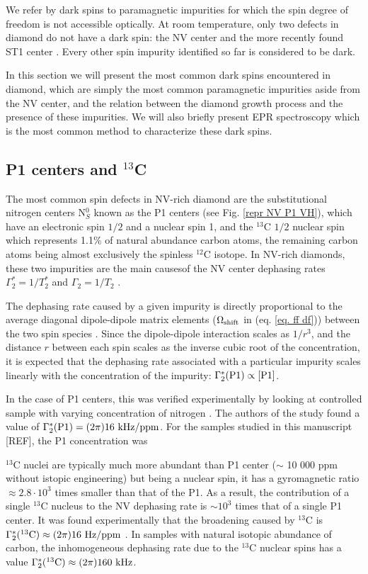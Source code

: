 \documentclass[a4paper,11pt]{report}
\begin{document}
We refer by dark spins to paramagnetic impurities for which the spin degree of freedom is not accessible optically. At room temperature, only two defects in diamond do not have a dark spin: the NV center and the more recently found ST1 center \citep{lee2013readout, john2017bright}. Every other spin impurity identified so far is considered to be dark.

In this section we will present the most common dark spins encountered in diamond, which are simply the most common paramagnetic impurities aside from the NV center, and the relation between the diamond growth process and the presence of these impurities. We will also briefly present EPR spectroscopy which is the most common method to characterize these dark spins.

\subsection{P1 centers and $^{13}$C}
The most common spin defects in NV-rich diamond are the substitutional nitrogen centers N$^0_S$ known as the P1 centers (see Fig. \ref{repr NV P1 VH}), which have an electronic spin $1/2$ and a nuclear spin 1, and the $^{13}$C $1/2$ nuclear spin which represents 1.1\% of natural abundance carbon atoms, the remaining carbon atoms being almost exclusively the spinless $^{12}$C isotope. In NV-rich diamonds, these two impurities are the main causesof the NV center dephasing rates $\Gamma_2^*=1/T_2^*$ and $\Gamma_2=1/T_2$  \citep{barry2020sensitivity}. 

The dephasing rate caused by a given impurity is directly proportional to the average diagonal dipole-dipole matrix elements ($\Omega_{\rm shift}$ in (eq. \ref{eq. ff df})) between the two spin species \citep{taylor2008high, bauch2020decoherence}. Since the dipole-dipole interaction scales as $1/r^3$, and the distance $r$ between each spin scales as the inverse cubic root of the concentration,  it is expected that the dephasing rate associated with a particular impurity scales linearly with the concentration of the impurity: $\Gamma_2^*(\rm P1) \propto [P1]$. 

In the case of P1 centers, this was verified experimentally by looking at controlled sample with varying concentration of nitrogen \citep{bauch2020decoherence}. The authors of the study found a value of $\Gamma_2^*(\rm P1)= (2 \pi) 16\ \rm kHz/ppm$. For the samples studied in this manuscript [REF], the P1 concentration was 

$^{13}$C nuclei are typically much more abundant than P1 center ($\sim$ 10 000 ppm without istopic engineering) but being a nuclear spin, it has a gyromagnetic ratio $\approx 2.8\cdot 10^3$ times smaller than that of the P1. As a result, the contribution of a single $^{13}$C nucleus to the NV dephasing rate is $\sim 10^3$ times that of a single P1 center. It was found experimentally that the broadening caused by $^{13}$C is $\Gamma_2^*(^{13}\rm C ) \approx (2 \pi) 16\ \rm Hz/ppm$ \citep{van1997dependences, barry2020sensitivity}. In samples with natural isotopic abundance of carbon, the inhomogeneous dephasing rate due to the $^{13}$C nuclear spins has a value $\Gamma_2^*(^{13}\rm C ) \approx (2 \pi) 160\ \rm kHz$.
\end{document}
